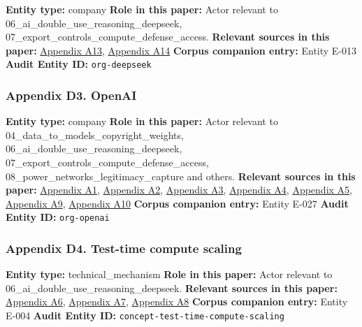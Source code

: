 \documentclass[
  american,
  11pt,
  letterpaper,
]{article}
\begin{document}
\textbf{Entity type:} company \textbf{Role in this paper:} Actor
relevant to 06\_ai\_double\_use\_reasoning\_deepseek,
07\_export\_controls\_compute\_defense\_access. \textbf{Relevant sources
in this paper:}
\hyperref[appendix-a13-deepseek-v3-technical-report]{Appendix A13},
\hyperref[appendix-a14-deepseek-r1-incentivizing-reasoning-capability-in-llms-via-reinforcement-learning]{Appendix
A14} \textbf{Corpus companion entry:} Entity E-013 \textbf{Audit Entity
ID:} \texttt{org-deepseek}

\subsubsection{Appendix D3. OpenAI}\label{appendix-d3-openai}

\textbf{Entity type:} company \textbf{Role in this paper:} Actor
relevant to 04\_data\_to\_models\_copyright\_weights,
06\_ai\_double\_use\_reasoning\_deepseek,
07\_export\_controls\_compute\_defense\_access,
08\_power\_networks\_legitimacy\_capture and others. \textbf{Relevant
sources in this paper:}
\hyperref[appendix-a1-learning-to-reason-with-llms]{Appendix A1},
\hyperref[appendix-a2-openai-o1-system-card]{Appendix A2},
\hyperref[appendix-a3-openai-acknowledges-new-models-increase-risk-of-misuse-to-create-bioweapons]{Appendix
A3},
\hyperref[appendix-a4-openai-researchers-warned-board-of-ai-breakthrough-ahead-of-ceo-ouster-sources-say]{Appendix
A4},
\hyperref[appendix-a5-exclusive-openai-working-on-new-reasoning-technology-under-code-name-strawberry]{Appendix
A5},
\hyperref[appendix-a9-chatgpt-plans-free-go-plus-pro-business-and-enterprise]{Appendix
A9}, \hyperref[appendix-a10-pricing-openai-api]{Appendix A10}
\textbf{Corpus companion entry:} Entity E-027 \textbf{Audit Entity ID:}
\texttt{org-openai}

\subsubsection{Appendix D4. Test-time compute
scaling}\label{appendix-d4-test-time-compute-scaling}

\textbf{Entity type:} technical\_mechanism \textbf{Role in this paper:}
Actor relevant to 06\_ai\_double\_use\_reasoning\_deepseek.
\textbf{Relevant sources in this paper:}
\hyperref[appendix-a6-scaling-llm-test-time-compute-optimally-can-be-more-effective-than-scaling-model-parameters]{Appendix
A6}, \hyperref[appendix-a7-s1-simple-test-time-scaling]{Appendix A7},
\hyperref[appendix-a8-it-s-not-that-simple-an-analysis-of-simple-test-time-scaling]{Appendix
A8} \textbf{Corpus companion entry:} Entity E-004 \textbf{Audit Entity
ID:} \texttt{concept-test-time-compute-scaling}
\end{document}
